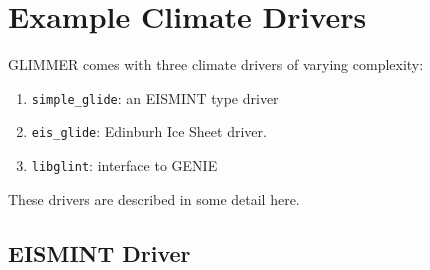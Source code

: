 \section{Example Climate Drivers}
GLIMMER comes with three climate drivers of varying complexity:
\begin{enumerate}
 \item \texttt{simple\_glide}: an EISMINT type driver
 \item \texttt{eis\_glide}: Edinburh Ice Sheet driver.
 \item \texttt{libglint}: interface to GENIE
\end{enumerate}
These drivers are described in some detail here.

\subsection{EISMINT Driver}
